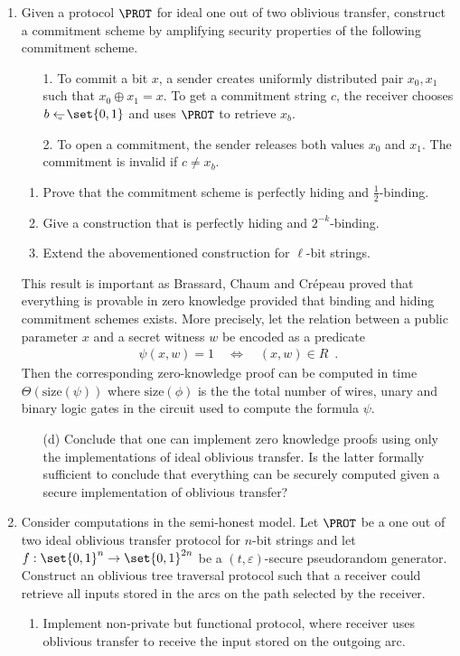 \documentclass{article}
\begin{document}
\begin{enumerate}
 \item Given a protocol $\PROT$ for ideal one out of two oblivious
   transfer, construct a commitment scheme by amplifying security
   properties of the following commitment scheme.
   \begin{enumerate}
   \item[1.] To commit a bit $x$, a sender creates uniformly distributed
     pair $x_0,x_1$ such that $x_0\oplus x_1=x$. To get a commitment
     string $c$, the receiver chooses $b\getsu\set{0,1}$ and uses
     $\PROT$ to retrieve $x_b$.
   \item[2.] To open a commitment, the sender releases both values
     $x_0$ and $x_1$. The commitment is invalid if $c\neq x_b$.
   \end{enumerate}
   \begin{enumerate}
   \item Prove that the commitment scheme is perfectly hiding and $\frac{1}{2}$-binding.
   \item Give a construction that is perfectly hiding and
     $2^{-k}$-binding.
   \item Extend the abovementioned construction for $\ell$-bit
     strings.
   \end{enumerate}
   This result is important as Brassard, Chaum and Cr\'{e}peau proved
   that everything is provable in zero knowledge provided that binding
   and hiding commitment schemes exists. More precisely, let the
   relation between a public parameter $x$ and a secret witness $w$ be
   encoded as a predicate
   \begin{align*}
     \psi(x,w)=1\quad\Leftrightarrow\quad (x,w)\in R\enspace.
   \end{align*}
   Then the corresponding zero-knowledge proof can be computed in time
   $\Theta(\mathrm{size}(\psi))$ where $\mathrm{size}(\phi)$ is the
   the total number of wires, unary and binary logic gates in the
   circuit used to compute the formula $\psi$.
   \begin{enumerate}
   \item[(d)] Conclude that one can implement zero knowledge proofs
     using only the implementations of ideal oblivious transfer. Is
     the latter formally sufficient to conclude that everything can be
     securely computed given a secure implementation of oblivious
     transfer?
   \end{enumerate}
 \item Consider computations in the semi-honest model. Let $\PROT$ be
   a one out of two ideal oblivious transfer protocol for $n$-bit
   strings and let $f:\set{0,1}^n\to\set{0,1}^{2n}$ be a
   $(t,\varepsilon)$-secure pseudorandom generator.  Construct an
   oblivious tree traversal protocol such that a receiver could
   retrieve all inputs stored in the arcs on the path selected by the
   receiver.
   \begin{enumerate}
   \item Implement non-private but functional protocol, where receiver
     uses oblivious transfer to receive the input stored on the
     outgoing arc.


\end{enumerate}
\end{enumerate}
\end{document}
